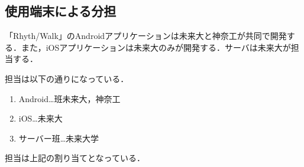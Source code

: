 \subsection{使用端末による分担}
\par
「Rhyth/Walk」のAndroidアプリケーションは未来大と神奈工が共同で開発する．また，iOSアプリケーションは未来大のみが開発する．サーバは未来大が担当する．
\par 担当は以下の通りになっている．
\begin{enumerate}
\item Android…班未来大，神奈工
\item iOS…未来大
\item サーバー班…未来大学
\end{enumerate}
\par
担当は上記の割り当てとなっている．
